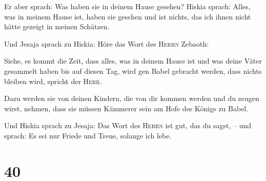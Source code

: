  Er aber sprach: Was haben sie in deinem Hause gesehen?
Hiskia sprach: Alles, was in meinem Hause ist, haben sie gesehen und ist
nichts, das ich ihnen nicht hätte gezeigt in meinen Schätzen.

 Und Jesaja sprach zu Hiskia: Höre das Wort des
\textsc{Herrn} Zebaoth:

 Siehe, es kommt die Zeit, dass alles, was in deinem Hause
ist und was deine Väter gesammelt haben bis auf diesen Tag, wird gen
Babel gebracht werden, dass nichts bleiben wird, spricht der
\textsc{Herr}.

 Dazu werden sie von deinen Kindern, die von dir kommen
werden und du zeugen wirst, nehmen, dass sie müssen Kämmerer sein am
Hofe des Königs zu Babel.

 Und Hiskia sprach zu Jesaja: Das Wort des \textsc{Herrn}
ist gut, das du sagst, -- und sprach: Es sei nur Friede und Treue,
solange ich lebe.

\hypertarget{section-39}{%
\section{40}\label{section-39}}

